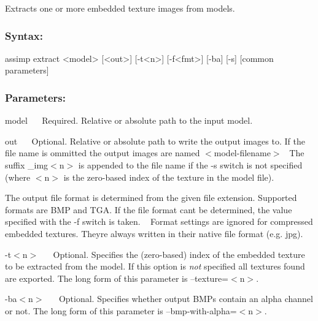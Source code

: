 Extracts one or more embedded texture images from models.

\subsubsection*{Syntax\+:}


\begin{DoxyCode}
assimp extract <model> [<out>] [-t<n>] [-f<fmt>] [-ba] [-s] [common parameters]
\end{DoxyCode}


\subsubsection*{Parameters\+:}

{\ttfamily  model~\newline
}~\newline
 Required. Relative or absolute path to the input model. 

{\ttfamily  out~\newline
}~\newline
 Optional. Relative or absolute path to write the output images to. If the file name is ommitted the output images are named {\ttfamily $<$model-\/filename$>$}~\newline
 The suffix {\ttfamily \+\_\+img$<$n$>$} is appended to the file name if the -\/s switch is not specified (where {\ttfamily $<$n$>$} is the zero-\/based index of the texture in the model file).~\newline


The output file format is determined from the given file extension. Supported formats are B\+M\+P and T\+G\+A. If the file format can\textquotesingle{}t be determined, the value specified with the -\/f switch is taken. ~\newline
 Format settings are ignored for compressed embedded textures. They\textquotesingle{}re always written in their native file format (e.\+g. jpg). 

{\ttfamily -\/t$<$n$>$~\newline
 }~\newline
 Optional. Specifies the (zero-\/based) index of the embedded texture to be extracted from the model. If this option is {\itshape not} specified all textures found are exported. The long form of this parameter is {\ttfamily --texture=$<$n$>$}. 

{\ttfamily -\/ba$<$n$>$~\newline
 }~\newline
 Optional. Specifies whether output B\+M\+Ps contain an alpha channel or not. The long form of this parameter is {\ttfamily --bmp-\/with-\/alpha=$<$n$>$}. 

